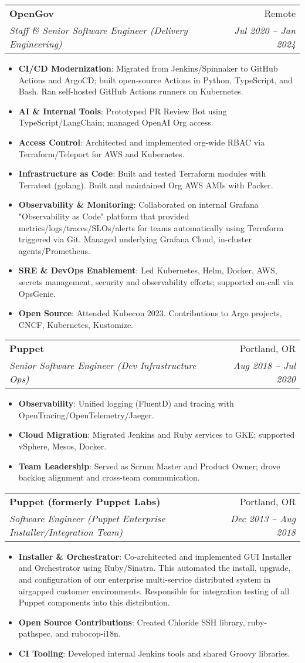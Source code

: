\documentclass[letterpaper,11pt]{article}
\makeatletter
\newcommand{\resumeItem}[2]{
\item[\textsc{}]\small{
    \textbf{#1}{: #2 \vspace{-2pt}}
  }
}
\newcommand{\resumeSubheading}[4]{
  \vspace{-1pt}\item
    \begin{tabular*}{0.97\textwidth}[t]{l@{\extracolsep{\fill}}r}
      \textbf{#1} & #2 \\
      \textit{\small#3} & \textit{\small #4} \\
    \end{tabular*}\vspace{-5pt}
}
\newcommand{\resumeItemListStart}{\begin{itemize}}
\newcommand{\resumeItemListEnd}{\end{itemize}\vspace{-5pt}}
\makeatother
\begin{document}
\resumeSubheading
  {OpenGov}{Remote}
  {Staff \& Senior Software Engineer (Delivery Engineering)}{Jul 2020 -- Jan 2024}
  \resumeItemListStart
    \resumeItem{CI/CD Modernization}
      {Migrated from Jenkins/Spinnaker to GitHub Actions and ArgoCD; built open-source Actions in Python, TypeScript, and Bash. Ran self-hosted GitHub Actions runners on Kubernetes.}
    \resumeItem{AI \& Internal Tools}
      {Prototyped PR Review Bot using TypeScript/LangChain; managed OpenAI Org access.}
    \resumeItem{Access Control}
      {Architected and implemented org-wide RBAC via Terraform/Teleport for AWS and Kubernetes.}
    \resumeItem{Infrastructure as Code}
      {Built and tested Terraform modules with Terratest (golang). Built and maintained Org AWS AMIs with Packer.}
    \resumeItem{Observability \& Monitoring}
      {Collaborated on internal Grafana "Observability as Code" platform that provided metrics/logs/traces/SLOs/alerts for teams automatically using Terraform triggered via Git. Managed underlying Grafana Cloud, in-cluster agents/Prometheus.}
    \resumeItem{SRE \& DevOps Enablement}
      {Led Kubernetes, Helm, Docker, AWS, secrets management, security and observability efforts; supported on-call via OpsGenie.}
    \resumeItem{Open Source}
      {Attended Kubecon 2023. Contributions to Argo projects, CNCF, Kubernetes, Kustomize.}
  \resumeItemListEnd

\resumeSubheading
  {Puppet}{Portland, OR}
  {Senior Software Engineer (Dev Infrastructure Ops)}{Aug 2018 -- Jul 2020}
  \resumeItemListStart
    \resumeItem{Observability}
      {Unified logging (FluentD) and tracing with OpenTracing/OpenTelemetry/Jaeger.}
    \resumeItem{Cloud Migration}
      {Migrated Jenkins and Ruby services to GKE; supported vSphere, Mesos, Docker.}
    \resumeItem{Team Leadership}
      {Served as Scrum Master and Product Owner; drove backlog alignment and cross-team communication.}
  \resumeItemListEnd

\resumeSubheading
  {Puppet (formerly Puppet Labs)}{Portland, OR}
  {Software Engineer (Puppet Enterprise Installer/Integration Team)}{Dec 2013 -- Aug 2018}
  \resumeItemListStart
    \resumeItem{Installer \& Orchestrator}
      {Co-architected and implemented GUI Installer and Orchestrator using Ruby/Sinatra. This automated the install, upgrade, and configuration of our enterprise multi-service distributed system in airgapped customer environments. Responsible for integration testing of all Puppet components into this distribution.}
    \resumeItem{Open Source Contributions}
      {Created Chloride SSH library, ruby-pathspec, and rubocop-i18n.}
    \resumeItem{CI Tooling}
      {Developed internal Jenkins tools and shared Groovy libraries.}
  \resumeItemListEnd
\end{document}
